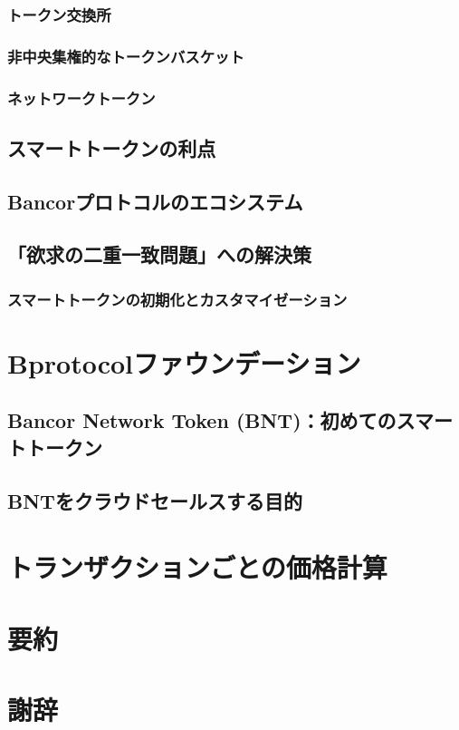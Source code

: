 \documentclass{jsarticle}
\begin{document}
    \subsubsection{トークン交換所}



    \subsubsection{非中央集権的なトークンバスケット}



    \subsubsection{ネットワークトークン}



  \subsection{スマートトークンの利点}



  \subsection{Bancorプロトコルのエコシステム}



  \subsection{「欲求の二重一致問題」への解決策}



    \subsubsection{スマートトークンの初期化とカスタマイゼーション}



\section{Bprotocolファウンデーション}



  \subsection{Bancor Network Token (BNT)：初めてのスマートトークン}



  \subsection{BNTをクラウドセールスする目的}



\section{トランザクションごとの価格計算}



\section{要約}



\section{謝辞}
\end{document}
